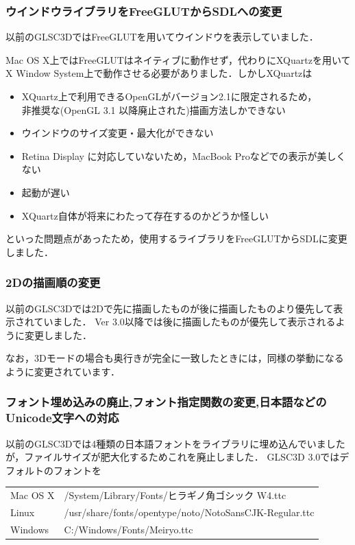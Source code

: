 \documentclass[platex,a4paper,12pt]{jsarticle}%
\begin{document}
\subsubsection{ウインドウライブラリをFreeGLUTからSDLへの変更}
以前のGLSC3DではFreeGLUTを用いてウインドウを表示していました．

Mac OS X上ではFreeGLUTはネイティブに動作せず，代わりにXQuartzを用いてX Window System上で動作させる必要がありました．しかしXQuartzは
\begin{itemize}
	\item XQuartz上で利用できるOpenGLがバージョン2.1に限定されるため，\\非推奨な(OpenGL 3.1 以降廃止された)描画方法しかできない
	\item ウインドウのサイズ変更・最大化ができない
	\item Retina Display に対応していないため，MacBook Proなどでの表示が美しくない
	\item 起動が遅い
	\item XQuartz自体が将来にわたって存在するのかどうか怪しい
\end{itemize}
といった問題点があったため，使用するライブラリをFreeGLUTからSDLに変更しました．

\subsubsection{2Dの描画順の変更}
以前のGLSC3Dでは2Dで先に描画したものが後に描画したものより優先して表示されていました．
Ver 3.0以降では後に描画したものが優先して表示されるように変更しました．

なお，3Dモードの場合も奥行きが完全に一致したときには，同様の挙動になるように変更されています．

\subsubsection{フォント埋め込みの廃止,フォント指定関数の変更,日本語などのUnicode文字への対応}
以前のGLSC3Dでは4種類の日本語フォントをライブラリに埋め込んでいましたが，ファイルサイズが肥大化するためこれを廃止しました．
GLSC3D 3.0ではデフォルトのフォントを
\begin{table}[h]
	\centering
	\begin{tabular}{ll}
		Mac OS X & /System/Library/Fonts/ヒラギノ角ゴシック W4.ttc\\
		Linux & /usr/share/fonts/opentype/noto/NotoSansCJK-Regular.ttc\\
		Windows & C:/Windows/Fonts/Meiryo.ttc\\
	\end{tabular}
\end{table}
\end{document}
